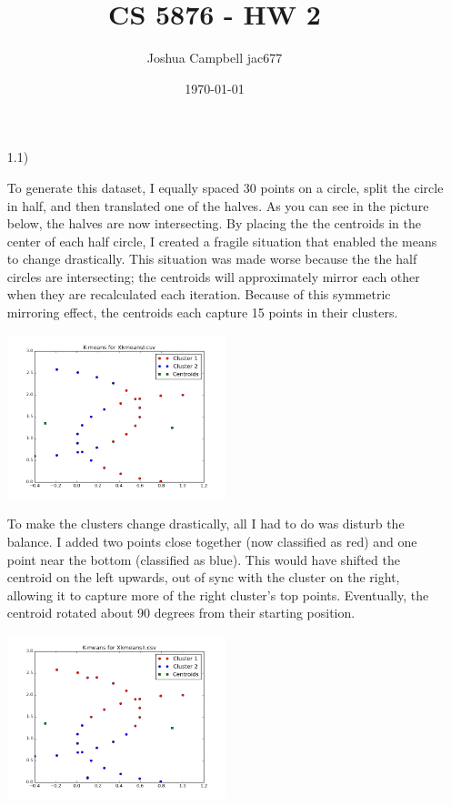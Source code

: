 \documentclass[12pt]{article}
\title{CS 5876 - HW 2}
\author{Joshua Campbell jac677}
\date{\today}
\begin{document}
\maketitle

\begin{enumerate}

\item[1.1)]

To generate this dataset, I equally spaced 30 points on a circle, split the circle in half, and then translated one of the halves. As you can see in the picture below, the halves are now intersecting. By placing the the centroids in the center of each half circle, I created a fragile situation that enabled the means to change drastically. This situation was made worse because the the half circles are intersecting; the centroids will approximately mirror each other when they are recalculated each iteration. Because of this symmetric mirroring effect, the centroids each capture 15 points in their clusters.

\includegraphics[width=0.5\textwidth]{K-means_for_XkmeansI.png}

To make the clusters change drastically, all I had to do was disturb the balance. I added two points close together (now classified as red) and one point near the bottom (classified as blue). This would have shifted the centroid on the left upwards, out of sync with the cluster on the right, allowing it to capture more of the right cluster's top points. Eventually, the centroid rotated about 90 degrees from their starting position.

\includegraphics[width=0.5\textwidth]{K-means_for_XkmeansII.png}


\end{enumerate}
\end{document}
